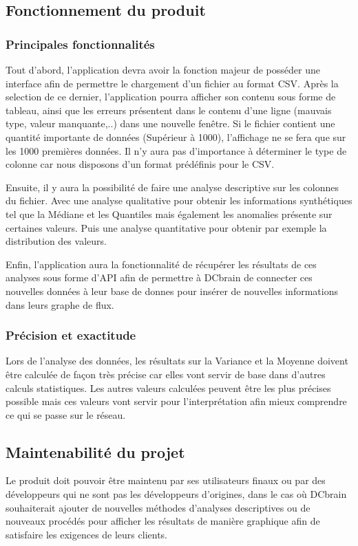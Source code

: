 		\subsection{Fonctionnement du produit}
			\subsubsection{Principales fonctionnalités}
			Tout d’abord, l’application devra avoir la fonction majeur de posséder une interface afin de permettre le chargement d’un fichier au format CSV. Après la selection de ce dernier, l’application pourra afficher son contenu sous forme de tableau, ainsi que les erreurs présentent dans le contenu d'une ligne (mauvais type, valeur manquante,..) dans une nouvelle fenêtre. Si le fichier contient une quantité importante de données (Supérieur à 1000), l’affichage ne se fera que sur les 1000 premières données.
			Il n’y aura pas d’importance à déterminer le type de colonne car nous disposons d'un format prédéfinis pour le CSV.\newline

			Ensuite, il y aura la possibilité de faire une analyse descriptive sur les colonnes du fichier. Avec une analyse qualitative pour obtenir les informations synthétiques tel que la Médiane et les Quantiles mais également les anomalies présente sur certaines valeurs. Puis une analyse quantitative pour obtenir par exemple la distribution des valeurs.\newline

			Enfin, l’application aura la fonctionnalité de récupérer les résultats de ces analyses sous forme d’API afin de permettre à DCbrain de connecter ces nouvelles données à leur base de donnes pour insérer de nouvelles informations dans leurs graphe de flux.

			\subsubsection{Précision et exactitude}
			Lors de l'analyse des données, les résultats sur la Variance et la Moyenne doivent être calculée de façon très précise car elles vont servir de base dans d’autres calculs statistiques. Les autres valeurs calculées peuvent être les plus précises possible mais ces valeurs vont servir pour l'interprétation afin mieux comprendre ce qui se passe sur le réseau.

		\subsection{Maintenabilité du projet}
		Le produit doit pouvoir être maintenu par ses utilisateurs finaux ou par des développeurs qui ne sont pas les développeurs d’origines, dans le cas où DCbrain souhaiterait ajouter de nouvelles méthodes d’analyses descriptives ou de nouveaux procédés pour afficher les résultats de manière graphique afin de satisfaire les exigences de leurs clients.\newline
		
